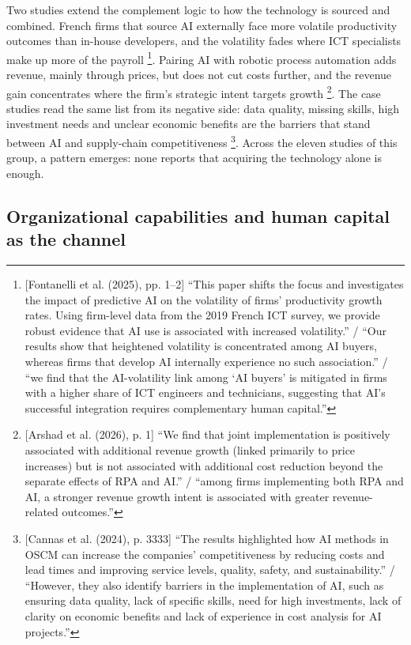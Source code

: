 Two studies extend the complement logic to how the technology is sourced and combined. French firms that source AI externally face more volatile productivity outcomes than in-house developers, and the volatility fades where ICT specialists make up more of the payroll \parencite[pp.~1--2]{fontanelli2025predictive}\footnote{[Fontanelli et al. (2025), pp. 1--2] ``This paper shifts the focus and investigates the impact of predictive AI on the volatility of firms' productivity growth rates. Using firm-level data from the 2019 French ICT survey, we provide robust evidence that AI use is associated with increased volatility.'' / ``Our results show that heightened volatility is concentrated among AI buyers, whereas firms that develop AI internally experience no such association.'' / ``we find that the AI-volatility link among `AI buyers' is mitigated in firms with a higher share of ICT engineers and technicians, suggesting that AI's successful integration requires complementary human capital.''}. Pairing AI with robotic process automation adds revenue, mainly through prices, but does not cut costs further, and the revenue gain concentrates where the firm's strategic intent targets growth \parencite[p.~1]{arshad2026making}\footnote{[Arshad et al. (2026), p. 1] ``We find that joint implementation is positively associated with additional revenue growth (linked primarily to price increases) but is not associated with additional cost reduction beyond the separate effects of RPA and AI.'' / ``among firms implementing both RPA and AI, a stronger revenue growth intent is associated with greater revenue-related outcomes.''}. The case studies read the same list from its negative side: data quality, missing skills, high investment needs and unclear economic benefits are the barriers that stand between AI and supply-chain competitiveness \parencite[p.~3333]{cannas2024artificial}\footnote{[Cannas et al. (2024), p. 3333] ``The results highlighted how AI methods in OSCM can increase the companies' competitiveness by reducing costs and lead times and improving service levels, quality, safety, and sustainability.'' / ``However, they also identify barriers in the implementation of AI, such as ensuring data quality, lack of specific skills, need for high investments, lack of clarity on economic benefits and lack of experience in cost analysis for AI projects.''}. Across the eleven studies of this group, a pattern emerges: none reports that acquiring the technology alone is enough.

\subsection{Organizational capabilities and human capital as the channel}
\label{sec:cond-capabilities}


